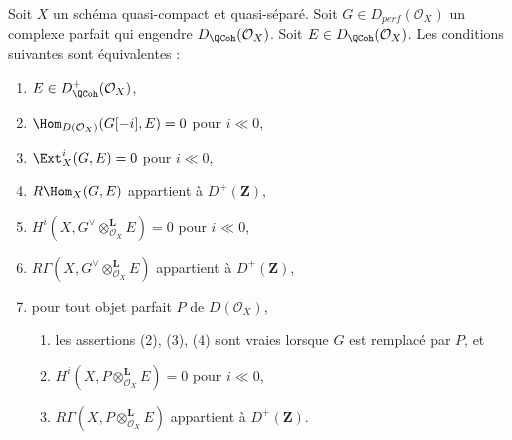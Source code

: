 \begin{proposition}
\label{proposition-detecting-bounded-below}
Soit $X$ un schéma quasi-compact et quasi-séparé.
Soit $G \in D_{perf}(\mathcal{O}_X)$
un complexe parfait qui engendre $D_\QCoh (\mathcal{O}_X)$. Soit
$E \in D_\QCoh (\mathcal{O}_X)$. Les conditions suivantes sont équivalentes :
\begin{enumerate}
\item $E \in D^+_\QCoh (\mathcal{O}_X)$,
\item $\Hom_{D(\mathcal{O}_X)}(G[-i], E) = 0$ pour $i \ll 0$,
\item $\Ext^i_X(G, E) = 0$ pour $i \ll 0$,
\item $R\Hom_X(G, E)$ appartient à $D^+(\mathbf{Z})$,
\item $H^i(X, G^\vee \otimes_{\mathcal{O}_X}^\mathbf{L} E) = 0$
pour $i \ll 0$,
\item $R\Gamma(X, G^\vee \otimes_{\mathcal{O}_X}^\mathbf{L} E)$
appartient à $D^+(\mathbf{Z})$,
\item pour tout objet parfait $P$ de $D(\mathcal{O}_X)$,
\begin{enumerate}
\item les assertions (2), (3), (4) sont vraies lorsque $G$ est remplacé par $P$, et
\item $H^i(X, P \otimes_{\mathcal{O}_X}^\mathbf{L} E) = 0$ pour $i \ll 0$,
\item $R\Gamma(X, P \otimes_{\mathcal{O}_X}^\mathbf{L} E)$
appartient à $D^+(\mathbf{Z})$.
\end{enumerate}
\end{enumerate}
\end{proposition}

